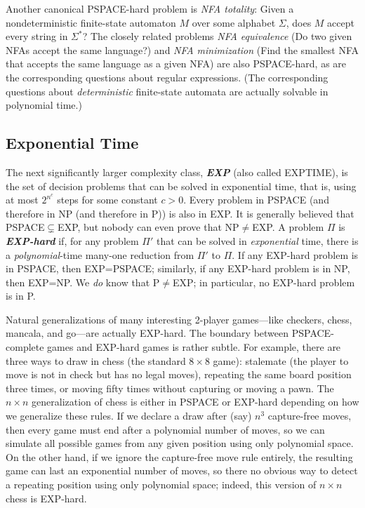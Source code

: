 Another canonical PSPACE-hard problem is \textit{NFA totality}: Given a nondeterministic finite-state automaton $M$ over some alphabet $\Sigma$, does $M$ accept every string in $\Sigma^*$?
The closely related problems \textit{NFA equivalence} (Do two given NFAs accept the same language?) and \textit{NFA minimization} (Find the smallest NFA that accepts the same language as a given NFA) are also PSPACE-hard, as are the corresponding questions about regular expressions.
(The corresponding questions about \textit{deterministic} finite-state automata are actually solvable in polynomial time.)

\subsection{Exponential Time}

The next significantly larger complexity class, \textbf{\textit{EXP}} (also called EXPTIME), is the set of decision problems that can be solved in exponential time, that is, using at most $2^{n^c}$ steps for some constant $c > 0$.
Every problem in PSPACE (and therefore in NP (and therefore in P)) is also in EXP.
It is generally believed that PSPACE${}\subsetneq{}$EXP, but nobody can even prove that NP${}\neq{}$EXP.
A problem $\Pi$ is \textbf{\textit{EXP-hard}} if, for any problem $\Pi'$ that can be solved in \textit{exponential} time, there is a \textit{polynomial}-time many-one reduction from $\Pi'$ to $\Pi$.
If any EXP-hard problem is in PSPACE, then EXP=PSPACE; similarly, if any EXP-hard problem is in NP, then EXP=NP.
We \textit{do} know that P${}\neq{}$EXP; in particular, no EXP-hard problem is in P.

Natural generalizations of many interesting 2-player games---like checkers, chess, mancala, and go---are actually EXP-hard.
The boundary between PSPACE-complete games and EXP-hard games is rather subtle.
For example, there are three ways to draw in chess (the standard $8 \times 8$ game): stalemate (the player to move is not in check but has no legal moves), repeating the same board position three times, or moving fifty times without capturing or moving a pawn.
The $n \times n$ generalization of chess is either in PSPACE or EXP-hard depending on how we generalize these rules.
If we declare a draw after (say) $n^3$ capture-free moves, then every game must end after a polynomial number of moves, so we can simulate all possible games from any given position using only polynomial space.
On the other hand, if we ignore the capture-free move rule entirely, the resulting game can last an exponential number of moves, so there no obvious way to detect a repeating position using only polynomial space; indeed, this version of $n \times n$ chess is EXP-hard.

